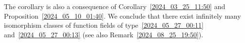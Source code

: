 \documentclass[12pt,reqno]{amsart}
\newtheorem{cor}[thm]{Corollary}
\theoremstyle{definition}
\DeclareMathOperator{\Spec}{Spec}%
\begin{document}

The corollary is also a consequence of Corollary~\ref{2024_03_25_11:50} and Proposition~\ref{2024_05_10_01:40}.
We conclude that there exist infinitely many isomorphism classes of function fields of type~\ref{2024_05_27_00:11} and~\ref{2024_05_27_00:13} (see also Remark~\ref{2024_08_25_19:50}).
\end{document}
